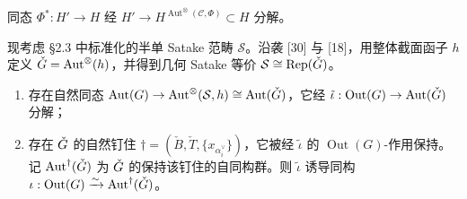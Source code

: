\begin{lemma}
同态 $\Phi^*:H'\to H$ 经 $H'\to H^{\operatorname{Aut}^\otimes(\mathcal C,\Phi)}\subset H$ 分解。
\end{lemma}

现考虑 §2.3 中标准化的半单 Satake 范畴 $\mathcal S$。沿袭 [30] 与 [18]，用整体截面函子 $h$ 定义 $\check G=\operatorname{Aut}^\otimes(h)$，并得到几何 Satake 等价 $\mathcal S\cong\mathrm{Rep}(\check G)$。

\begin{lemma}
\begin{enumerate}[label=(\arabic*), leftmargin=1.9em, itemsep=.2em]
\item 存在自然同态 $\operatorname{Aut}(G)\to\operatorname{Aut}^\otimes(\mathcal S,h)\cong\operatorname{Aut}(\check G)$，它经 $\tilde\iota:\operatorname{Out}(G)\to\operatorname{Aut}(\check G)$ 分解；
\item 存在 $\check G$ 的自然钉住 $\dagger=(\check B,\check T,\{x_{\alpha_i^\vee}\})$，它被经 $\tilde\iota$ 的 $\operatorname{Out}(G)$-作用保持。记 $\operatorname{Aut}^\dagger(\check G)$ 为 $\check G$ 的保持该钉住的自同构群。则 $\tilde\iota$ 诱导同构 $\iota:\operatorname{Out}(G)\xrightarrow{\sim}\operatorname{Aut}^\dagger(\check G)$。
\end{enumerate}
\end{lemma}

